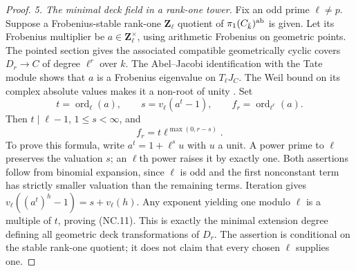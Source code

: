 \documentclass[11pt,a4paper]{article}
\begin{document}
\begin{proof}
\emph{5. The minimal deck field in a rank-one tower.}
Fix an odd prime $\ell\ne p$. Suppose a Frobenius-stable
rank-one $\mathbf Z_\ell$ quotient of
$\pi_1(C_{\bar k})^{\rm ab}$ is given. Let its Frobenius
multiplier be $a\in\mathbf Z_\ell^\times$, using arithmetic
Frobenius on geometric points. The pointed section gives
the associated compatible geometrically cyclic covers
$D_r\to C$ of degree $\ell^r$ over $k$.
The Abel--Jacobi identification with the Tate module
\cite[Proposition~9.1]{MilneJV}
\cite[Remark~15.3]{MilneAV}
shows that $a$ is a Frobenius eigenvalue on $T_\ell J_C$.
The Weil bound on its complex absolute values makes it
a non-root of unity \cite[Theorem~19.1]{MilneAV}.
Set
\[
 t=\operatorname{ord}_{\ell}(a),\qquad
 s=v_\ell(a^t-1),\qquad
 f_r=\operatorname{ord}_{\ell^r}(a).
       \tag{NC.10}
\]
Then $t\mid\ell-1$, $1\le s<\infty$, and
\[
                         f_r=t\ell^{\max(0,r-s)}.
       \tag{NC.11}
\]
To prove this formula, write $a^t=1+\ell^s u$ with $u$ a
unit. A power prime to $\ell$ preserves the valuation $s$;
an $\ell$th power raises it by exactly one. Both assertions
follow from binomial expansion, since $\ell$ is odd and
the first nonconstant term has strictly smaller valuation
than the remaining terms. Iteration gives
$v_\ell((a^t)^h-1)=s+v_\ell(h)$.
Any exponent yielding one modulo $\ell$ is a multiple of
$t$, proving (NC.11). This is exactly the minimal extension
degree defining all geometric deck transformations of $D_r$.
The assertion is conditional on the stable rank-one quotient;
it does not claim that every chosen $\ell$ supplies one.


\end{proof}
\end{document}
